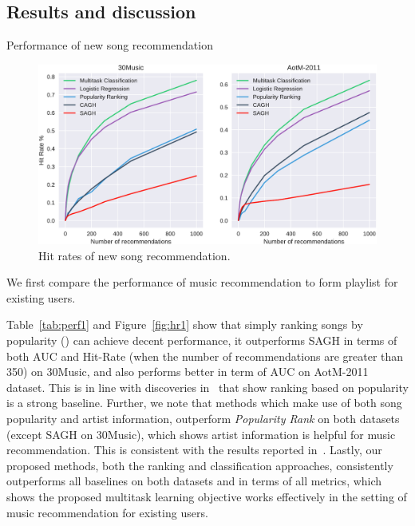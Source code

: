 
\subsection{Results and discussion}


\begin{table}[t]
\centering
\caption{Performance of new song recommendation}
\label{tab:perf0}
\resizebox{\columnwidth}{!}{

}
\end{table}

\begin{figure}[t]
\centering
\includegraphics[width=\linewidth]{fig/hitrate0.pdf}
\caption{Hit rates of new song recommendation.}
\label{fig:hr0}
\end{figure}





We first compare the performance of music recommendation to form playlist for existing users.

Table~\ref{tab:perf1} and Figure~\ref{fig:hr1} show that simply ranking songs by popularity ()
can achieve decent performance,
it outperforms SAGH in terms of both AUC and Hit-Rate (when the number of recommendations are greater than 350) on 30Music,
and also performs better in term of AUC on AotM-2011 dataset.
This is in line with discoveries in~\cite{bonnin2013evaluating,jannach2015beyond,bonnin2015automated} that show ranking based on
popularity is a strong baseline.
Further, we note that methods which make use of both song popularity and artist information,
outperform {\it Popularity Rank} on both datasets (except SAGH on 30Music), which shows artist information is helpful for music recommendation.
This is consistent with the results reported in~\cite{bonnin2013evaluating,bonnin2015automated}.
Lastly, our proposed methods, both the ranking and classification approaches, consistently outperforms all baselines
on both datasets and in terms of all metrics, which shows the proposed multitask learning objective works effectively
in the setting of music recommendation for existing users.

